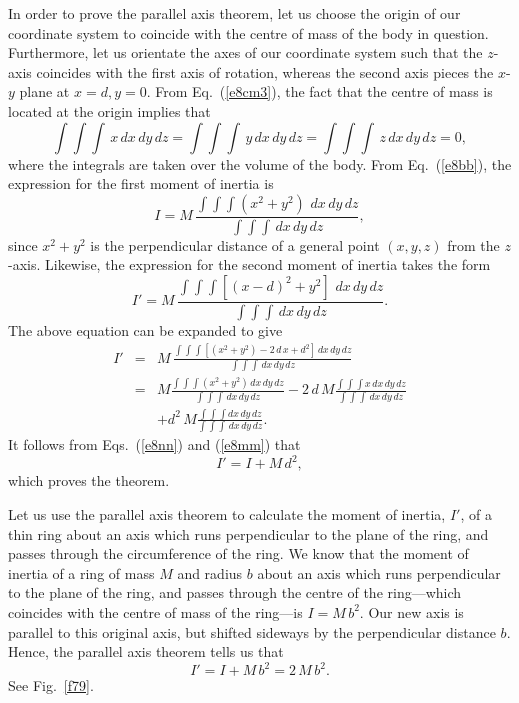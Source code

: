 In order to prove the parallel axis theorem, let us choose the origin of our
coordinate system to coincide with the centre of mass of the body in question. 
Furthermore, let us orientate the axes of our coordinate system such that
the $z$-axis coincides with the first axis of rotation, whereas the second
axis pieces the $x$-$y$ plane at $x=d, y=0$. From Eq.~(\ref{e8cm3}), the fact that
the centre of mass is located at the origin implies that
\begin{equation}\label{e8nn}
\int\!\int\!\int\, x\,dx\,dy\,dz = \int\!\int\!\int\,y\,dx\,dy\,dz=\int\!\int\!\int\, z\,dx\,dy\,dz=0,
\end{equation}
where the integrals are taken over the volume of the body. From Eq.~(\ref{e8bb}),
the expression for the first moment of inertia is
\begin{equation}\label{e8mm}
I = M\,\frac{\int\!\int\!\int (x^2+y^2)\,\,dx\,dy\,dz}
{\int\!\int\!\int \,dx\,dy\,dz},
\end{equation}
since $x^2+y^2$ is the perpendicular distance of a general point $(x,y,z)$ from the $z$-axis.
Likewise, the expression for the second moment of inertia takes the
form 
\begin{equation}
I' = M\,\frac{\int\!\int\!\int [(x-d)^2+y^2]\,\,dx\,dy\,dz}
{\int\!\int\!\int \,dx\,dy\,dz}.
\end{equation}
The above equation can be expanded to give
\begin{eqnarray}
I' &=& M\,\frac{\int\!\int\!\int [(x^2+y^2) - 2\,d\,x + d^2]\,dx\,dy\,dz}
{\int\!\int\!\int \,dx\,dy\,dz}\nonumber\\[0.5ex]
&=& M\frac{\int\!\int\!\int (x^2+y^2)\,dx\,dy\,dz}
{\int\!\int\!\int \,dx\,dy\,dz}-2\,d\,M\frac{\int\!\int\!\int x\,dx\,dy\,dz}
{\int\!\int\!\int \,dx\,dy\,dz}\nonumber\\[0.5ex]&&
 + d^2\,M \frac{\int\!\int\!\int dx\,dy\,dz}
{\int\!\int\!\int \,dx\,dy\,dz}.
\end{eqnarray}
It follows from Eqs.~(\ref{e8nn}) and (\ref{e8mm}) that
\begin{equation}
I' = I + M\,d^2,
\end{equation}
which proves the theorem.

Let us use the parallel axis theorem to calculate the moment of inertia, $I'$, of a thin
ring about an axis which runs perpendicular to the plane of the ring, and passes
through the circumference of the ring. We know that the moment of inertia of a ring of mass
$M$ and radius $b$ about an axis which runs perpendicular to the plane of the ring, and passes
through the centre of the ring---which coincides with the centre
of mass of the ring---is $I=M\,b^2$. Our new axis is parallel to this original axis, but shifted
sideways by the perpendicular distance $b$. Hence, the parallel
axis theorem tells us that
\begin{equation}
I' = I + M\,b^2 = 2\,M\,b^2.
\end{equation}
See Fig.~\ref{f79}.

